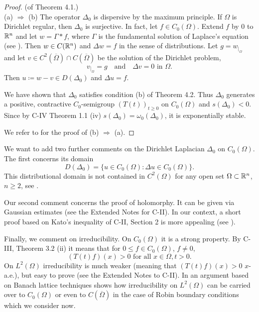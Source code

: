 \begin{proof}(of Theorem 4.1.)  \\
(a) $\Rightarrow$ (b)
The operator $\Delta_{0}$ is dispersive by the maximum principle. 
If $\Omega$ is Dirichlet regular, then $\Delta_{0}$ is surjective. 
In fact, let $f \in C_{0}(\Omega)$. 
Extend $f$ by $0$ to $\mathbb{R}^n$ and let $w = \Gamma * f$, where $\Gamma$ is the fundamental solution of Laplace's equation (see \citet[(2.12)]{GT83}). 
Then $w \in C(\mathbb{R}^n)$ and $\Delta w = f$ in the sense of distributions. 
Let $g = w_{|_{\Omega}}$ and let $v \in C^{2}(\overline{\Omega}) \cap C(\overline{\Omega})$ be the solution of the Dirichlet problem, \ie 
%
\[
	v_{|_{\Omega}} = g 
	\quad \text{and} \quad \Delta v = 0 \text{ in $\Omega$.}
\]
%
Then $u \coloneq w - v \in D(\Delta_{0})$ and $\Delta u = f$.

We have shown that $\Delta_{0}$ satisfies condition (b) of Theorem 4.2. 
Thus $\Delta_{0}$ generates a positive, contractive $C_{0}$-semigroup $(T(t))_{t \geq 0}$ on $C_{0}(\Omega)$ and $s(\Delta_{0}) < 0$. 
Since by C-IV Theorem 1.1 (iv) $s(\Delta_{0}) = \omega_{0}(\Delta_{0})$, it is exponentially stable.

We refer to \citet{ArBe99} for the proof of (b) $\Rightarrow$ (a).
\end{proof}
We want to add two further comments on the Dirichlet Laplacian $\Delta_{0}$ on $C_{0}(\Omega)$. 
The first concerns its domain
\[
	D(\Delta_{0}) = \{u \in C_{0}(\Omega) \colon \Delta u \in C_{0}(\Omega)\}.
\]
This distributional domain is not contained in $C^{2}(\Omega)$ for any open set $\Omega \subset \mathbb{R}^n$, $n \geq 2$, see \citet[Theorem 6.60]{Au23}. 

Our second comment concerns the proof of holomorphy. 
It can be given via Gaussian estimates (see the Extended Notes for C-II). 
In our context, a short proof based on Kato's inequality of C-II, Section 2 is more appealing (see \citet{ArBa92}).

Finally, we comment on irreducibility. 
On $C_{0}(\Omega)$ it is a strong property. 
By C-III, Theorem 3.2 (ii) it means that for $0 \leq f \in C_{0}(\Omega)$, $f \neq 0$,
\[
	(T(t)f)(x) > 0 \text{ for all } x \in \Omega, t > 0.
\]
On $L^{2}(\Omega)$ irreducibility is much weaker (meaning that $(T(t)f)(x) > 0$ $x$-a.e.), but easy to prove (see the Extended Notes to C-II). 
In \citet{AEG20} an argument based on Banach lattice techniques shows how irreducibility on $L^{2}(\Omega)$ can be carried over to $C_{0}(\Omega)$ or even to $C(\overline{\Omega})$ in the case of Robin boundary conditions which we consider now.

